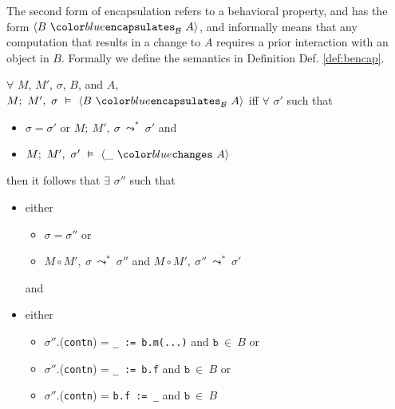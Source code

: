 \documentclass[acmsmall,review,anonymous]{acmart}\settopmatter{printfolios=true,printccs=false,printacmref=false}
\begin{document}
The second form of encapsulation refers to a behavioral property, and has the form 
$\bencapsulates{B}{A}$, and informally means that any computation that results in a 
change to $A$ requires a prior interaction with an object in $B$. Formally we define 
the semantics in Definition Def. \ref{def:bencap}.
\begin{definition}
\label{def:bencap}
$\forall$ $M$, $M'$, $\sigma$, $B$, and $A$, \\
$M;\ M',\ \sigma\ \vDash\ \bencapsulates{B}{A}$ iff
$\forall$ $\sigma'$ such that
\begin{itemize}
\item
$\sigma = \sigma'$ or $M;\ M',\ \sigma\ \leadsto^*\ \sigma'$ and
\item
$M;\ M',\ \sigma'\ \vDash\ \changes{\_}{A}$
\end{itemize}
then it follows that $\exists$ $\sigma''$ such that
\begin{itemize}
\item
either
\begin{itemize}
\item
$\sigma = \sigma''$ or 
\item
$M \circ M',\ \sigma\ \leadsto^*\ \sigma''$ and
$M \circ M',\ \sigma''\ \leadsto^*\ \sigma'$
\end{itemize}
and
\item
either
\begin{itemize}
\item
$\sigma''$.(\texttt{contn}) = \texttt{\_ := b.m(...)} and $\texttt{b}\ \in\ B$ or
\item
$\sigma''$.(\texttt{contn}) = \texttt{\_ := b.f} and $\texttt{b}\ \in\ B$ or
\item
$\sigma''$.(\texttt{contn}) = \texttt{b.f := \_} and $\texttt{b}\ \in\ B$
\end{itemize}
\end{itemize}
\end{definition}
\end{document}
